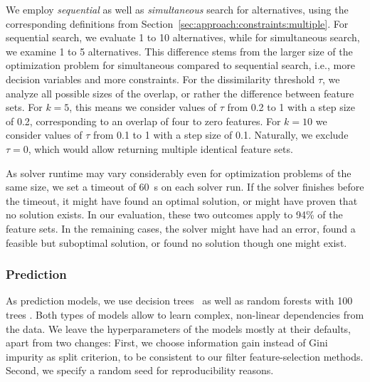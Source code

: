 \documentclass[conference]{IEEEtran}
\theoremstyle{definition}
\begin{document}
We employ \emph{sequential} as well as \emph{simultaneous} search for alternatives, using the corresponding definitions from Section~\ref{sec:approach:constraints:multiple}.
For sequential search, we evaluate 1 to 10 alternatives, while for simultaneous search, we examine 1 to 5 alternatives.
This difference stems from the larger size of the optimization problem for simultaneous compared to sequential search, i.e., more decision variables and more constraints.
For the dissimilarity threshold $\tau$, we analyze all possible sizes of the overlap, or rather the difference between feature sets.
For $k=5$, this means we consider values of $\tau$ from 0.2 to 1 with a step size of 0.2, corresponding to an overlap of four to zero features.
For $k=10$ we consider values of $\tau$ from 0.1 to 1 with a step size of 0.1.
Naturally, we exclude $\tau = 0$, which would allow returning multiple identical feature sets.

As solver runtime may vary considerably even for optimization problems of the same size, we set a timeout of 60~s on each solver run.
If the solver finishes before the timeout, it might have found an optimal solution, or might have proven that no solution exists.
In our evaluation, these two outcomes apply to 94\% of the feature sets.
In the remaining cases, the solver might have had an error, found a feasible but suboptimal solution, or found no solution though one might exist.


\subsubsection{Prediction}
\label{sec:experimental-design:approaches:prediction}

As prediction models, we use decision trees~\cite{breiman1984classification} as well as random forests with 100 trees \cite{breiman2001random}.
Both types of models allow to learn complex, non-linear dependencies from the data.
We leave the hyperparameters of the models mostly at their defaults, apart from two changes:
First, we choose information gain instead of Gini impurity as split criterion, to be consistent to our filter feature-selection methods.
Second, we specify a random seed for reproducibility reasons.
\end{document}
